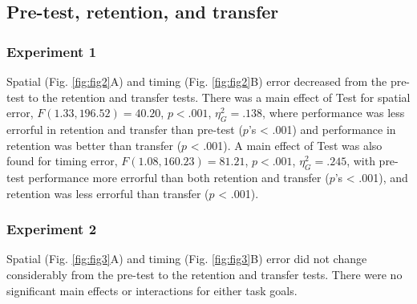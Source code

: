 \documentclass[
  doc, donotrepeattitle,floatsintext]{apa7}
\begin{document}
\hypertarget{pre-test-retention-and-transfer}{%
\subsection{Pre-test, retention, and transfer}\label{pre-test-retention-and-transfer}}

\hypertarget{experiment-1-2}{%
\subsubsection{Experiment 1}\label{experiment-1-2}}

Spatial (Fig. \ref{fig:fig2}A) and timing (Fig. \ref{fig:fig2}B) error decreased from the pre-test to the retention and transfer tests. There was a main effect of Test for spatial error, \(F(1.33,196.52) = 40.20\), \(p < .001\), \(\eta_{G}^2 = .138\), where performance was less errorful in retention and transfer than pre-test (\(p\)'s \textless{} .001) and performance in retention was better than transfer (\(p\) \textless{} .001). A main effect of Test was also found for timing error, \(F(1.08,160.23) = 81.21\), \(p < .001\), \(\eta_{G}^2 = .245\), with pre-test performance more errorful than both retention and transfer (\(p\)'s \textless{} .001), and retention was less errorful than transfer (\(p\) \textless{} .001).

\hypertarget{experiment-2-2}{%
\subsubsection{Experiment 2}\label{experiment-2-2}}

Spatial (Fig. \ref{fig:fig3}A) and timing (Fig. \ref{fig:fig3}B) error did not change considerably from the pre-test to the retention and transfer tests. There were no significant main effects or interactions for either task goals.

\vspace{4ex}
\end{document}
